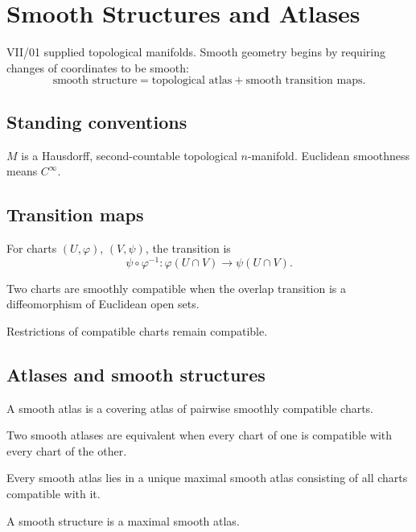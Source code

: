 \chapter{Smooth Structures and Atlases}
\label{ch:vii02-smooth-structures-and-atlases}

VII/01 supplied topological manifolds. Smooth geometry begins by requiring changes of coordinates to be smooth:
\[
\boxed{\text{smooth structure}=\text{topological atlas}+\text{smooth transition maps}.}
\]

\section*{Standing conventions}
\(M\) is a Hausdorff, second-countable topological \(n\)-manifold. Euclidean smoothness means \(C^\infty\).

\section{Transition maps}
\begin{definition}\label{def:vii02-transition}
For charts \((U,\varphi)\), \((V,\psi)\), the transition is
\[
\psi\circ\varphi^{-1}:\varphi(U\cap V)\to\psi(U\cap V).
\]
\end{definition}
\begin{definition}\label{def:vii02-compatible}
Two charts are smoothly compatible when the overlap transition is a diffeomorphism of Euclidean open sets.
\end{definition}
\begin{proposition}[Restriction]\label{prop:vii02-restrictions}
Restrictions of compatible charts remain compatible.
\end{proposition}

\section{Atlases and smooth structures}
\begin{definition}\label{def:vii02-smooth-atlas}
A smooth atlas is a covering atlas of pairwise smoothly compatible charts.
\end{definition}
\begin{definition}\label{def:vii02-equivalent-atlases}
Two smooth atlases are equivalent when every chart of one is compatible with every chart of the other.
\end{definition}
\begin{theorem}\label{thm:vii02-maximal-atlas}
Every smooth atlas lies in a unique maximal smooth atlas consisting of all charts compatible with it.
\end{theorem}
\begin{definition}\label{def:vii02-smooth-structure}
A smooth structure is a maximal smooth atlas.
\end{definition}

